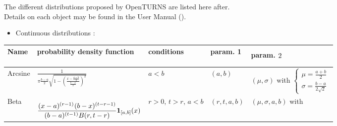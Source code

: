 The different distributions proposed by OpenTURNS are listed here after.\\[1em]

Details on each object may be found in the User Manual  ().\\[1em]

\begin{itemize}
\item Continuous distributions :
\end{itemize}

{\footnotesize

  \noindent \begin{tabular}{|p{1.8cm}|p{6.0cm}|p{2.7cm}|p{1.7cm}|p{4.6cm}|}
    \hline
    Name & probability density function & conditions & param. 1 & param. $2^{\strut}_{\strut}$\\
    \hline
    Arcsine & $\frac{1}{\pi \frac{b-a}{2} \sqrt{1-\left(\frac{x-\frac{a+b}{2}}{\frac{b-a}{2}}\right)^{2}}}$ & $a <b$& $(a, b)$ & $(\mu, \sigma)$ with
    $
    \left\{
      \begin{array}{l}
        \mu = \frac{a+b}{2} \\
        \sigma = \frac{b-a}{2\sqrt{2}}
      \end{array}
    \right.
    $ \\
    \hline
    Beta & $\displaystyle  \frac{(x-a)^{(r-1)^{\strut}}(b-x)^{(t-r-1)}}{(b-a)^{(t-1)}B(r,t-r)}\boldsymbol{1}_{[a,b]}(x)$  & $r>0$, $t>r$, $a < b$ & $(r, t, a, b)$ & $(\mu, \sigma, a,b)$ with


\end{tabular}}
